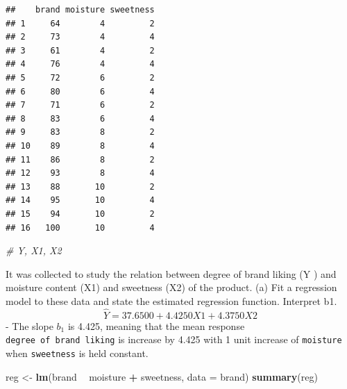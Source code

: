 \documentclass[
]{article}
\newenvironment{Shaded}{\begin{snugshade}}{\end{snugshade}}
\newcommand{\CommentTok}[1]{\textcolor[rgb]{0.56,0.35,0.01}{\textit{#1}}}
\newcommand{\DataTypeTok}[1]{\textcolor[rgb]{0.13,0.29,0.53}{#1}}
\newcommand{\KeywordTok}[1]{\textcolor[rgb]{0.13,0.29,0.53}{\textbf{#1}}}
\newcommand{\NormalTok}[1]{#1}
\newcommand{\OperatorTok}[1]{\textcolor[rgb]{0.81,0.36,0.00}{\textbf{#1}}}
\newcommand{\StringTok}[1]{\textcolor[rgb]{0.31,0.60,0.02}{#1}}
\begin{document}
\begin{Shaded}
\end{Shaded}

\begin{verbatim}
##    brand moisture sweetness
## 1     64        4         2
## 2     73        4         4
## 3     61        4         2
## 4     76        4         4
## 5     72        6         2
## 6     80        6         4
## 7     71        6         2
## 8     83        6         4
## 9     83        8         2
## 10    89        8         4
## 11    86        8         2
## 12    93        8         4
## 13    88       10         2
## 14    95       10         4
## 15    94       10         2
## 16   100       10         4
\end{verbatim}

\begin{Shaded}
\begin{Highlighting}[]
\CommentTok{# Y, X1, X2}
\end{Highlighting}
\end{Shaded}

It was collected to study the relation between degree of brand liking (Y
) and moisture content (X1) and sweetness (X2) of the product. (a) Fit a
regression model to these data and state the estimated regression
function. Interpret b1. \[
\hat{Y} = 37.6500 + 4.4250X1 + 4.3750X2
\] - The slope \(b_1\) is 4.425, meaning that the mean response
\texttt{degree\ of\ brand\ liking} is increase by 4.425 with 1 unit
increase of \texttt{moisture} when \texttt{sweetness} is held constant.

\begin{Shaded}
\begin{Highlighting}[]
\NormalTok{reg <-}\StringTok{ }\KeywordTok{lm}\NormalTok{(brand }\OperatorTok{~}\StringTok{ }\NormalTok{moisture }\OperatorTok{+}\StringTok{ }\NormalTok{sweetness, }\DataTypeTok{data =}\NormalTok{ brand)}
\KeywordTok{summary}\NormalTok{(reg)}
\end{Highlighting}
\end{Shaded}
\end{document}
